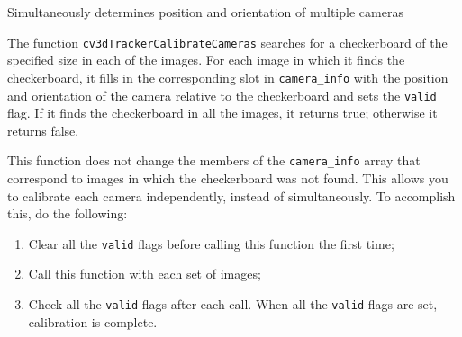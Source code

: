 
Simultaneously determines position and orientation of multiple cameras


\begin{description}
\end{description}

The function \texttt{cv3dTrackerCalibrateCameras} searches for a checkerboard of the specified size in each of the images. For each image in which it finds the checkerboard, it fills in the corresponding slot in \texttt{camera\_info} with the position and orientation of the camera relative to the checkerboard and sets the \texttt{valid} flag. If it finds the checkerboard in all the images, it returns true; otherwise it returns false.

This function does not change the members of the \texttt{camera\_info} array that correspond to images in which the checkerboard was not found. This allows you to calibrate each camera independently, instead of simultaneously. To accomplish this, do the following:
\begin{enumerate}
\item Clear all the \texttt{valid} flags before calling this function the first time;
\item Call this function with each set of images;
\item Check all the \texttt{valid} flags after each call. When all the \texttt{valid} flags are set, calibration is complete.
\end{enumerate}

